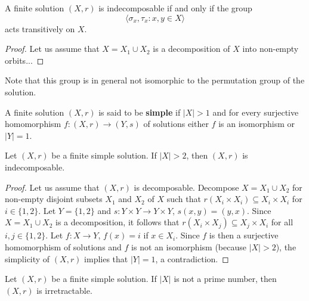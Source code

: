 \begin{proposition}
A finite solution $(X,r)$ is indecomposable if and only if 
the group 
\[
\langle \sigma_x,\tau_x:x,y\in X\rangle
\]
acts transitively on $X$. 
\end{proposition}

\begin{proof}
    Let us assume that $X=X_1\cup X_2$ is a decomposition of $X$ into non-empty orbits... 
\end{proof}

Note that this group is in general not isomorphic to the permutation group of the solution. 

\begin{definition}
A finite solution $(X,r)$ is said to be \textbf{simple} if $|X|>1$ and for every 
surjective homomorphism $f\colon (X,r)\to (Y,s)$ of solutions
either $f$ is an isomorphism or $|Y|=1$. 
\end{definition}

\begin{example}
\end{example}

\begin{example}
\end{example}

\begin{example}
\end{example}

\begin{proposition}
\label{pro:simple=>indecomposable}
Let $(X,r)$ be a finite simple solution. 
If $|X|>2$, then $(X,r)$ is indecomposable. 
\end{proposition}

\begin{proof}
Let us assume that $(X,r)$ is decomposable. Decompose $X=X_1\cup X_2$ 
for non-empty disjoint subsets $X_1$ and $X_2$ of $X$ such 
that $r(X_i\times X_i)\subseteq X_i\times X_i$ for $i\in\{1,2\}$. 
Let $Y=\{1,2\}$ and $s\colon Y\times Y\to Y\times Y$, $s(x,y)=(y,x)$. 
Since $X=X_1\cup X_2$ is a decomposition, it follows that $r(X_i\times X_j)\subseteq X_j\times X_i$ for all $i,j\in\{1,2\}$. 
Let $f\colon X\to Y$, $f(x)=i$ if $x\in X_i$. 
Since $f$ is then a surjective homomorphism of solutions and $f$ is not an isomorphism (because $|X|>2$), the 
simplicity of $(X,r)$ implies that $|Y|=1$, a contradiction. 
\end{proof}

\begin{proposition}
Let $(X,r)$ be a finite simple  solution. 
If $|X|$ is not a prime number, then $(X,r)$ is irretractable.
\end{proposition}

